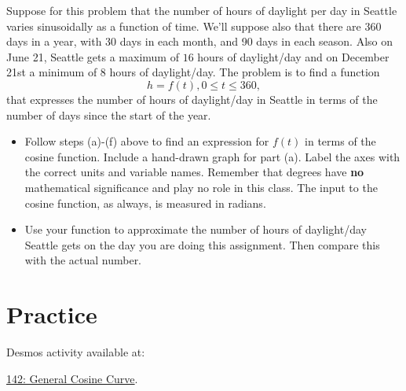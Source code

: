 \documentclass{ximera}
\begin{document}
\begin{question}  \label{Qdsg77jhre}
Suppose for this problem that the number of hours of daylight per day in Seattle varies sinusoidally as a function of time. We'll suppose also that there are 360 days in a year, with 30 days in each month, and 90 days in each season. Also on June 21, Seattle gets a maximum of $16$ hours of daylight/day and on December 21st a minimum of $8$ hours of daylight/day. The problem is to find a function 
\[
  h = f(t) , 0\leq t \leq 360 ,
\]
that expresses the number of hours of daylight/day in Seattle in terms of the number of days since the start of the year. 

\begin{itemize}
\item{Follow steps (a)-(f) above to find an expression for $f(t)$ in terms of the cosine function. Include a hand-drawn graph for part (a). Label the axes with the correct units and variable names. Remember that degrees have {\bf no} mathematical significance and play no role in this class. The input to the cosine function, as always, is measured in radians.}

\item{Use your function to approximate the number of hours of daylight/day Seattle gets on the day you are doing this assignment. Then compare this with the actual number.}
\end{itemize}
\end{question}


\section{Practice}

\begin{exploration}   \label{Edsgtjnh}
Desmos activity available at:

\href{https://www.desmos.com/calculator/ruysb5sjsy}{142: General Cosine Curve}.

 
\begin{onlineOnly}
    \begin{center}
\end{center}
\end{onlineOnly}


\end{exploration}
\end{document}
